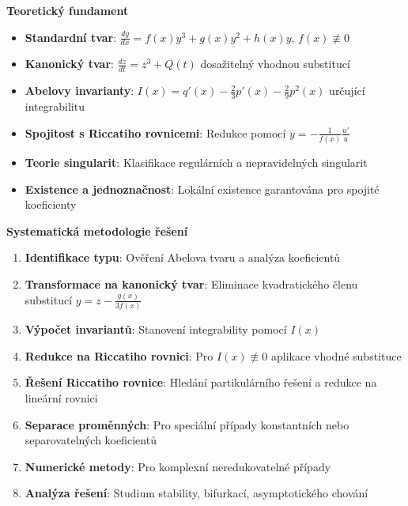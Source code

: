 \vspace{1\baselineskip}

\noindent\textbf{Teoretický fundament}

\begin{itemize}
\item \textbf{Standardní tvar}: $\frac{dy}{dx} = f(x)y^3 + g(x)y^2 + h(x)y$, $f(x) \not\equiv 0$
\item \textbf{Kanonický tvar}: $\frac{dz}{dt} = z^3 + Q(t)$ dosažitelný vhodnou substitucí
\item \textbf{Abelovy invarianty}: $I(x) = q'(x) - \frac{2}{3}p'(x) - \frac{2}{9}p^2(x)$ určující integrabilitu
\item \textbf{Spojitost s Riccatiho rovnicemi}: Redukce pomocí $y = -\frac{1}{f(x)}\frac{u'}{u}$
\item \textbf{Teorie singularit}: Klasifikace regulárních a nepravidelných singularit
\item \textbf{Existence a jednoznačnost}: Lokální existence garantována pro spojité koeficienty
\end{itemize}

\vspace{1\baselineskip}

\noindent\textbf{Systematická metodologie řešení}

\begin{enumerate}
\item \textbf{Identifikace typu}: Ověření Abelova tvaru a analýza koeficientů
\item \textbf{Transformace na kanonický tvar}: Eliminace kvadratického členu substitucí $y = z - \frac{g(x)}{3f(x)}$
\item \textbf{Výpočet invariantů}: Stanovení integrability pomocí $I(x)$
\item \textbf{Redukce na Riccatiho rovnici}: Pro $I(x) \not\equiv 0$ aplikace vhodné substituce
\item \textbf{Řešení Riccatiho rovnice}: Hledání partikulárního řešení a redukce na lineární rovnici
\item \textbf{Separace proměnných}: Pro speciální případy konstantních nebo separovatelných koeficientů
\item \textbf{Numerické metody}: Pro komplexní neredukovatelné případy
\item \textbf{Analýza řešení}: Studium stability, bifurkací, asymptotického chování
\end{enumerate}

\vspace{1\baselineskip}

